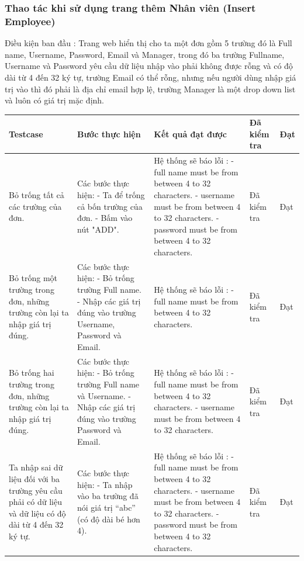 \documentclass[a4paper]{article}
\begin{document}
\subsubsection*{Thao tác khi sử dụng trang thêm Nhân viên  (Insert Employee) }
Điều kiện ban đầu : Trang web hiển thị cho ta một đơn gồm 5 trường đó là Full name, Username, Password, Email và Manager, trong đó ba trường Fullname, Username và Password yêu cầu dữ liệu nhập vào phải không được rỗng và có độ dài từ 4 đến 32 ký tự, trường Email có thể rỗng, nhưng nếu người dùng nhập giá trị vào thì đó phải là địa chỉ email hợp lệ, trường Manager là một drop down list và luôn có giá trị mặc định.  \newline
\begin{longtable}{ | p{} |p{} | p{}  | p{}  | p{}  | } 
\hline
\textbf{Testcase}& \textbf{Bước thực hiện}& \textbf{Kết quả đạt được} & \textbf{Đã kiểm tra}& \textbf{Đạt} \\ 
\hline
\hline
Bỏ trống tất cả các trường của đơn. &
Các bước thực hiện: \newline
- Ta để trống cả bốn trường của đơn.
- Bấm vào nút "ADD".
&
Hệ thống sẽ báo lỗi : 
- full name must be from between 4 to 32 characters. \newline
- username must be from between 4 to 32 characters. \newline
- password must be from between 4 to 32 characters.
&
Đã kiểm tra &
Đạt \\

\hline
Bỏ trống một trường trong đơn, những trường còn lại ta nhập giá trị đúng. 
&
Các bước thực hiện: \newline
- Bỏ trống trường Full name. 
- Nhập các giá trị đúng vào trường Username, Password và Email. 
&
Hệ thống sẽ báo lỗi : 
- full name must be from between 4 to 32 characters.
&
Đã kiểm tra &
Đạt \\

\hline
Bỏ trống hai trường trong đơn, những trường còn lại ta nhập giá trị đúng. 
&
Các bước thực hiện: \newline
- Bỏ trống trường Full name và Username. 
- Nhập các giá trị đúng vào trường Password và Email. 
&
Hệ thống sẽ báo lỗi : 
- full name must be from between 4 to 32 characters.
- username must be from between 4 to 32 characters.
&
Đã kiểm tra &
Đạt \\

\hline
Ta nhập sai dữ liệu đối với ba trường yêu cầu phải có dữ liệu và dữ liệu có độ dài từ 4 đến 32 ký tự. 
&
Các bước thực hiện: \newline
- Ta nhập vào ba trường đã nói giá trị “abc” (có độ dài bé hơn 4). 
&
Hệ thống sẽ báo lỗi : \newline
- full name must be from between 4 to 32 characters. \newline
- username must be from between 4 to 32 characters. \newline
- password must be from between 4 to 32 characters.
&
Đã kiểm tra &
Đạt \\


\end{longtable}
\end{document}

